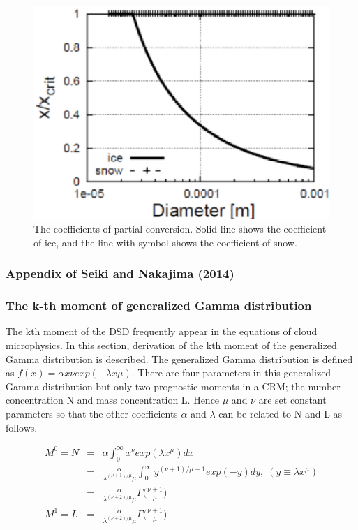 \begin{figure}[htpb]
\begin{center}
\includegraphics[scale=0.5]{./figure/partial_conversion_coef.eps}
\end{center}
\caption{The coefficients of partial conversion. Solid line shows the coefficient of ice, and the line with symbol shows the coefficient of snow.}
\label{figsn2-23}
\end{figure}

\subsubsection{Appendix of Seiki and Nakajima (2014)}
\subsubsection{The k-th moment of generalized Gamma distribution}
The kth moment of the DSD frequently appear in the equations of cloud microphysics. In this section, derivation of the kth moment of the generalized Gamma distribution is described. The generalized Gamma distribution is defined as $f(x) = \alpha x \nu exp(-\lambda x \mu)$. There are four parameters in this generalized Gamma distribution but only two prognostic moments in a CRM; the number concentration N and mass concentration L. Hence $\mu$ and $\nu$ are set constant parameters so that the other coefficients $\alpha$ and $\lambda$ can be related to N and L as follows.

\begin{eqnarray}
M^{0}=N&=&\alpha\int_{0}^{\infty}x^{\nu}exp(\lambda x^{\mu})dx\nonumber\\
&=&\frac{\alpha}{\lambda^{(\nu+1)/\mu}\mu}\int_{0}^{\infty}y^{(\nu+1)/\mu-1}exp(-y)dy,\;(y\equiv\lambda x^{\mu})\nonumber\\
&=&\frac{\alpha}{\lambda^{(\nu+2)/\mu}\mu}\Gamma\bigl(\frac{\nu+1}{\mu}\bigr)\label{sn255}\\
M^{1}=L&=&\frac{\alpha}{\lambda^{(\nu+2)/\mu}\mu}\Gamma\bigl(\frac{\nu+1}{\mu}\bigr)\nonumber
\end{eqnarray}

